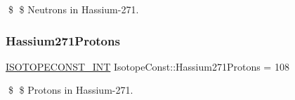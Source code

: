 \$ \$ Neutrons in Hassium-\/271. \mbox{\label{group___isotope_const-_hassium-_hs271_ga0d2a6987d02649536124bb0ae1619a57}} 
\subsubsection{\texorpdfstring{Hassium271\+Protons}{Hassium271Protons}}
{\footnotesize\ttfamily \mbox{\hyperlink{group___isotope_const-_macros_ga5f18360b3e99483a35c32d789e62621c}{I\+S\+O\+T\+O\+P\+E\+C\+O\+N\+S\+T\+\_\+\+I\+NT}} Isotope\+Const\+::\+Hassium271\+Protons = 108}

\$ \$ Protons in Hassium-\/271. 